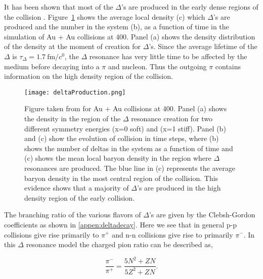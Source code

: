 It has been shown that most of the $\Delta$'s are produced in the early dense regions of the collision \cite{mingzhang}. Figure~\ref{fig:deltaProduction} shows the average local density (c) which $\Delta$'s are produced and the number in the system (b), as a function of time in the simulation of Au + Au collisions at \SI{400}{\MeVA}. Panel (a) shows the density distribution of the density at the moment of creation for $\Delta$'s. Since the average lifetime of the $\Delta$  is $\tau_{\Delta} = \SI{1.7}{\femto\metre\per\clight}$, the $\Delta$ resonance has very little time to be affected by the medium before decaying into a $\pi$ and nucleon. Thus the outgoing $\pi$ contains information on the high density region of the collision. 

\begin{figure}[!htb]
\centering
\texttt{[image: deltaProduction.png]}
\caption{Figure taken from \cite{mingzhang} for Au + Au collisions at \SI{400}{\MeVA}. Panel (a) shows the density in the region of the $\Delta$ resonance creation for two different symmetry energies (x=0 soft) and (x=1 stiff). Panel (b) and (c) show the evolution of collision in time steps, where (b) shows the number of deltas in the system as a function of time and (c) shows the mean local baryon density in the region where $\Delta$ resonances are produced. The blue line in (c) represents the average baryon density in the most central region of the collision. This evidence shows that a majority of $\Delta$'s are produced in the high density region of the early collision.}
\label{fig:deltaProduction}
\end{figure}

The branching ratio of the various flavors of $\Delta$'s are given by the Clebsh-Gordon coefficients as shown in \ref{appen:deltadecay}. Here we see that in general p-p collisions give rise primarily to  $\pi^+$ and n-n collisions give rise to primarily $\pi^-$. In this $\Delta$ resonance model the charged pion ratio can be described as,

\begin{equation}
\frac{\pi^-}{\pi^+} = \frac{ 5N^2 + ZN }{5Z^2 + ZN}.
\label{eq:deltaModel}
\end{equation}

